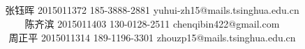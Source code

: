 

\title{ \\  \\}
\date{}
\author{张钰晖 2015011372 185-3888-2881 yuhui-zh15@mails.tsinghua.edu.cn\\
陈齐滨 2015011403 130-0128-2511 chenqibin422@gmail.com\\
周正平 2015011314 189-1196-3301 zhouzp15@mails.tsinghua.edu.cn}

\maketitle
\clearpage
\tableofcontents
\graphicspath{ {images/} }























